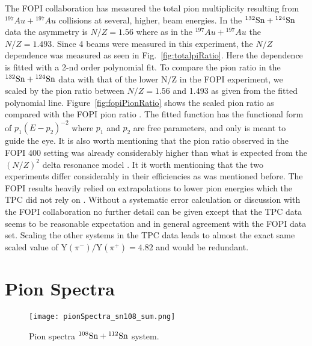 The FOPI collaboration has measured the total pion multiplicity resulting from ${}^{197}Au + {}^{197}Au$ collisions at several, higher, beam energies. In the ${}^{132}\mathrm{Sn} + {}^{124}\mathrm{Sn}$ data the asymmetry is $N/Z=1.56$ where as in the ${}^{197}Au + {}^{197}Au$ the $N/Z=1.493$. Since 4 beams were measured in this experiment, the $N/Z$ dependence was measured as seen in Fig.~\ref{fig:totalpiRatio}. Here the dependence is fitted with a 2-nd order polynomial fit. To compare the pion ratio in the ${}^{132}\mathrm{Sn} + {}^{124}\mathrm{Sn}$ data with that of the lower N/Z in the FOPI experiment, we scaled by the pion ratio between $N/Z=1.56$ and 1.493 as given from the fitted polynomial line. Figure~\ref{fig:fopiPionRatio} shows the scaled pion ratio as compared with the FOPI pion ratio \cite{fopi}. The fitted function has the functional form of $p_1(E - p_2)^{-2}$ where $p_1$ and $p_2$ are free parameters, and only is meant to guide the eye. It is also worth mentioning that the pion ratio observed in the FOPI \SI{400}{\MeVA} setting was already considerably higher than what is expected from the $(N/Z)^2$ delta resonance model \cite{baoan_piprod1,baoan_piprod2}. It it worth mentioning that the two experiments differ considerably in their efficiencies as was mentioned before. The FOPI results heavily relied on extrapolations to lower pion energies which the \spirit TPC did not rely on \cite{fopi}. Without a systematic error calculation or discussion with the FOPI collaboration no further detail can be given except that the \spirit TPC data seems to be reasonable expectation and in general agreement with the FOPI data set. Scaling the other systems in the \spirit TPC data leads to almost the exact same scaled value of $\mathrm{Y}(\pi^-)/\mathrm{Y}(\pi^+) = \num{4.82}$ and would be redundant. 




\section{Pion Spectra}
\label{sec:pionSpectra}


\begin{comment}
\begin{figure}[!htb]
\centering
\texttt{[image: pionSpectra.png]}
\caption{Pion spectra. }
\label{fig:pionspectra}
\end{figure}
\end{comment}

\begin{figure}[!htb]
\centering
\texttt{[image: pionSpectra\_sn108\_sum.png]}
\caption{Pion spectra ${}^{108}\mathrm{Sn} + {}^{112}\mathrm{Sn}$ system. }
\label{fig:pionspectraSn108}
\end{figure}


